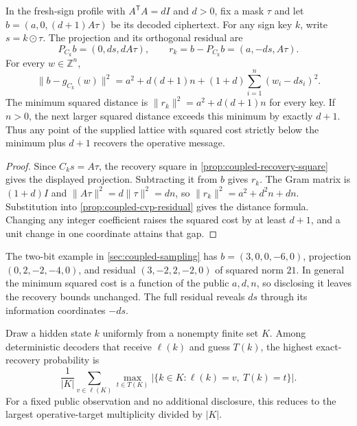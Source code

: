\begin{proposition}
\label{prop:fresh-sign-cvp-residual}
In the fresh-sign profile with \(A^{\mathsf T}A=dI\) and \(d>0\), fix
a mask \(\tau\) and let \(b=(a,0,(d+1)A\tau)\) be its decoded ciphertext.
For any sign key \(k\), write \(s=k\mathbin\odot\tau\). The projection and
its orthogonal residual are
\[
 P_{C_k}b=(0,ds,dA\tau),\qquad
 r_k=b-P_{C_k}b=(a,-ds,A\tau).
\]
For every \(w\in\mathbb Z^n\),
\[
  \|b-g_{C_k}(w)\|^2
  = a^2+d(d+1)n+(1+d)\sum_{i=1}^n(w_i-ds_i)^2.
\]
The minimum squared distance is \(\|r_k\|^2=a^2+d(d+1)n\) for every key.
If \(n>0\), the next larger squared distance exceeds this minimum by
exactly \(d+1\). Thus any point of the supplied lattice with squared cost
strictly below the minimum plus \(d+1\) recovers the operative message.
\end{proposition}

\begin{proof}
Since \(C_ks=A\tau\), the recovery square in
\cref{prop:coupled-recovery-square} gives the displayed projection.
Subtracting it from \(b\) gives \(r_k\). The Gram matrix is \((1+d)I\)
and \(\|A\tau\|^2=d\|\tau\|^2=dn\), so
\(\|r_k\|^2=a^2+d^2n+dn\). Substitution into
\cref{prop:coupled-cvp-residual} gives the distance formula. Changing any
integer coefficient raises the squared cost by at least \(d+1\), and a
unit change in one coordinate attains that gap.
\end{proof}

The two-bit example in \cref{sec:coupled-sampling} has
\(b=(3,0,0,-6,0)\), projection \((0,2,-2,-4,0)\), and residual
\((3,-2,2,-2,0)\) of squared norm \(21\). In general the minimum squared
cost is a function of the public \(a,d,n\), so disclosing it leaves the
recovery bounds unchanged. The full residual reveals \(ds\) through its
information coordinates \(-ds\).

\begin{proposition}
\label{prop:finite-disclosure}
Draw a hidden state \(k\) uniformly from a nonempty finite set \(K\).
Among deterministic decoders that receive \(\ell(k)\) and guess \(T(k)\),
the highest exact-recovery probability is
\[
  \frac{1}{|K|}\sum_{v\in\ell(K)}\max_{t\in T(K)}
    \bigl|\{k\in K:\ell(k)=v,\ T(k)=t\}\bigr|.
\]
For a fixed public observation and no additional disclosure, this reduces
to the largest operative-target multiplicity divided by \(|K|\).
\end{proposition}

